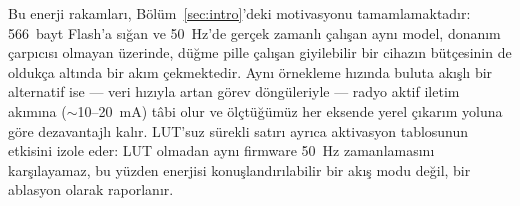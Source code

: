 \begin{table}[t]
\centering
\caption{\msp{} konuşlandırması için türetilmiş enerji.
$E$/çıkarım\,=\,$P_{\text{sürekli}} \times t_{\text{adım}}$;
$E$/pencere\,=\,$P \times T_{\text{pencere}}$; 50\,Hz akış satırında
LPM uykusu araya girer (128 örnek $\times$ 20\,ms\,=\,2{,}56\,s).
Pil ömrü 2000\,mAh / 3{,}7\,V Li-ion hücre (7{,}4\,Wh) varsayar.
LUT'suz satır ablasyon amaçlıdır: LUT olmadan 20\,ms akış zaman
sınırı aşılır ($t_{\text{adım}}\approx421$\,ms), dolayısıyla 50\,Hz
akış satırı yoktur.}
\label{tab:energy-derived}
\end{table}

Bu enerji rakamları, Bölüm~\ref{sec:intro}'deki motivasyonu
tamamlamaktadır: 566~bayt Flash'a sığan ve 50~Hz'de gerçek zamanlı
çalışan aynı model, donanım çarpıcısı olmayan \msp{} üzerinde,
düğme pille çalışan giyilebilir bir cihazın bütçesinin de oldukça
altında bir akım çekmektedir. Aynı örnekleme hızında buluta akışlı
bir alternatif ise --- veri hızıyla artan görev döngüleriyle ---
radyo aktif iletim akımına ($\sim$10--20~mA) tâbi olur ve ölçtüğümüz
her eksende yerel çıkarım yoluna göre dezavantajlı kalır. LUT'suz
sürekli satırı ayrıca aktivasyon tablosunun etkisini izole eder:
LUT olmadan aynı firmware 50~Hz zamanlamasını karşılayamaz, bu yüzden
enerjisi konuşlandırılabilir bir akış modu değil, bir ablasyon olarak
raporlanır.

